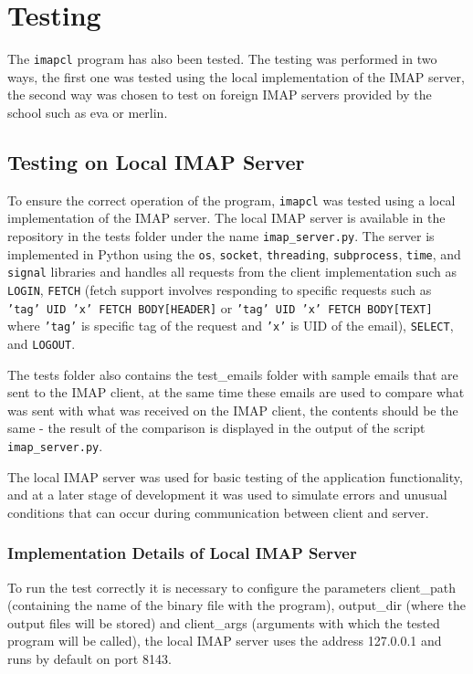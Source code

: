 \documentclass[a4paper,11pt]{article}
\begin{document}
\section{Testing}
The \verb!imapcl! program has also been tested. The testing was performed in two ways, 
the first one was tested using the local implementation of the IMAP server, the second 
way was chosen to test on foreign IMAP servers provided by the school such as eva or merlin.

\newpage

\subsection{Testing on Local IMAP Server}
To ensure the correct operation of the program, \texttt{imapcl} was tested using a local 
implementation of the IMAP server. The local IMAP server is available in the repository 
in the tests folder under the name \texttt{imap\_server.py}. The server is implemented in Python 
using the \texttt{os}, \texttt{socket}, \texttt{threading}, \texttt{subprocess}, 
\texttt{time}, and \texttt{signal} libraries and handles all requests from the client 
implementation such as \texttt{LOGIN}, \texttt{FETCH} (fetch support involves responding to 
specific requests such as \texttt{'tag' UID 'x' FETCH BODY[HEADER]} or \texttt{'tag' UID 'x' FETCH BODY[TEXT]} 
where \texttt{'tag'} is specific tag of the request and \texttt{'x'} is UID of the email), 
\texttt{SELECT}, and \texttt{LOGOUT}.

The tests folder also contains the test\_emails folder with sample emails that are sent to 
the IMAP client, at the same time these emails are used to compare what was sent with what 
was received on the IMAP client, the contents should be the same - the result of the 
comparison is displayed in the output of the script \texttt{imap\_server.py}.

The local IMAP server was used for basic testing of the application functionality, 
and at a later stage of development it was used to simulate errors and unusual conditions 
that can occur during communication between client and server.

\subsubsection{Implementation Details of Local IMAP Server}
To run the test correctly it is necessary to configure the parameters client\_path (containing the name of the binary file with the program), 
output\_dir (where the output files will be stored) and client\_args (arguments with which the tested program will be called), 
the local IMAP server uses the address 127.0.0.1 and runs by default on port 8143.
\end{document}
